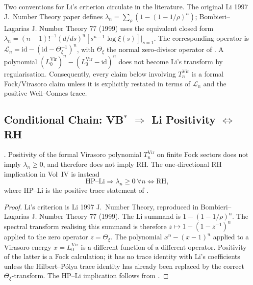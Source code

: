 \begin{remark}
\label{v4-arith:vb:rem:why-T_n}
Two conventions for Li's criterion circulate in the literature. The
original Li 1997 J.~Number Theory paper defines
\(\lambda_{n}=\sum_{\rho}(1-(1-1/\rho)^{n})\); Bombieri--Lagarias J.
Number Theory 77 (1999) uses the equivalent closed form
\(\lambda_{n}=(n-1)!^{-1}(d/ds)^{n}[s^{n-1}\log\xi(s)]\big|_{s=1}\).
The corresponding operator is
\(\mathcal L_{n}=\mathrm{id}-(\mathrm{id}-\Theta_{\xi}^{-1})^{n}\),
with \(\Theta_{\xi}\) the normal zero-divisor operator of
. A polynomial
\((L_{0}^{\mathrm{Vir}})^{n}-(L_{0}^{\mathrm{Vir}}-\mathrm{id})^{n}\)
does not become Li's transform by regularisation. Consequently, every
claim below involving \(T_{n}^{\mathrm{Vir}}\) is a formal
Fock/Virasoro claim unless it is explicitly restated in terms of
\(\mathcal L_{n}\) and the positive Weil--Connes trace.
\end{remark}

\subsection{Conditional Chain: VB\(^{*}\) \(\Rightarrow\) Li Positivity \(\Leftrightarrow\) RH}
\label{v4-arith:vb:equivalence-chain}

\begin{proposition}
\label{v4-arith:vb:thm:three-equivalences}
\ClaimStatusProvedHere. Positivity of the formal Virasoro polynomial
\(T_{n}^{\mathrm{Vir}}\) on finite Fock sectors does not imply
\(\lambda_{n}\geq0\), and therefore does not imply RH. The
one-directional RH implication in Vol~IV is instead
\[
\mathrm{HP\text{--}Li}\Longrightarrow \lambda_{n}\geq 0\ \forall n
\Longleftrightarrow \mathrm{RH},
\]
where HP--Li is the positive trace statement of
.
\end{proposition}

\begin{proof}
Li's criterion is Li 1997 J.~Number Theory, reproduced in
Bombieri--Lagarias J. Number Theory 77 (1999). The Li summand is
\(1-(1-1/\rho)^{n}\). The spectral transform realising this summand
is therefore \(z\mapsto1-(1-z^{-1})^{n}\) applied to the zero
operator \(z=\Theta_{\xi}\). The polynomial \(x^{n}-(x-1)^{n}\)
applied to a Virasoro energy \(x=L_{0}^{\mathrm{Vir}}\) is a different
function of a different operator. Positivity of the latter is a Fock
calculation; it has no trace identity with Li's coefficients unless
the Hilbert--P\'olya trace identity has already been replaced by the
correct \(\Theta_{\xi}\)-transform. The HP--Li implication follows
from .
\end{proof}

